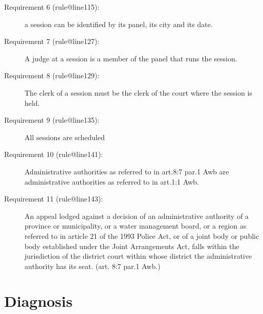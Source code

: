 \documentclass[10pt,a4paper]{report}              %
\theoremstyle{plain}\theorembodyfont{\rmfamily}\newtheorem{definition}{Definition}[section]
\theoremstyle{plain}\theorembodyfont{\rmfamily}\newtheorem{designrule}[definition]{Requirement}
\begin{document}
\begin{description}
\item[Requirement 6 (rule@line115):]
\label{ReqRule:rule@line115}
a session can be identified by its panel, its city and its date.

\end{description}
\begin{description}
\item[Requirement 7 (rule@line127):]
\label{ReqRule:rule@line127}
A judge at a session is a member of the panel that runs the session.

\end{description}
\begin{description}
\item[Requirement 8 (rule@line129):]
\label{ReqRule:rule@line129}
The clerk of a session must be the clerk of the court where the session
is held.

\end{description}
\begin{description}
\item[Requirement 9 (rule@line135):]
\label{ReqRule:rule@line135}
All sessions are scheduled

\end{description}
\begin{description}
\item[Requirement 10 (rule@line141):]
\label{ReqRule:rule@line141}
Administrative authorities as referred to in art.8:7 par.1 Awb are
administrative authorities as referred to in art.1:1 Awb.

\end{description}
\begin{description}
\item[Requirement 11 (rule@line143):]
\label{ReqRule:rule@line143}
An appeal lodged against a decision of an administrative authority of a
province or municipality, or a water management board, or a region as
referred to in article 21 of the 1993 Police Act, or of a joint body or
public body established under the Joint Arrangements Act, falls within
the jurisdiction of the district court within whose district the
administrative authority has its seat. (art. 8:7 par.1 Awb.)

\end{description}
\chapter{Diagnosis}\label{chpDiagnosis}
\end{document}
